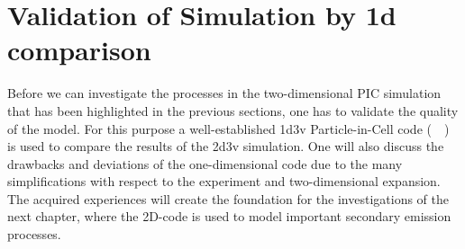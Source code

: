 %
\chapter{Validation of Simulation by 1d comparison}\label{sec:chapter_onedcomparison}
%
    Before we can investigate the processes in the two-dimensional PIC simulation that has been highlighted in the previous sections, one has to validate the quality of the model. For this purpose a well-established 1d3v Particle-in-Cell code (~\cite{Birdsall91,Matyash07oxIII,Matyash07PIC}~) is used to compare the results of the 2d3v simulation. One will also discuss the drawbacks and deviations of the one-dimensional code due to the many simplifications with respect to the experiment and two-dimensional expansion. The acquired experiences will create the foundation for the investigations of the next chapter, where the 2D-code is used to model important secondary emission processes.
%
